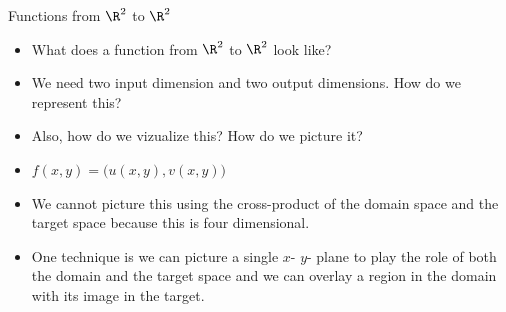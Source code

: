 \documentclass{beamer}
\begin{document}
\begin{frame}{Functions from $\R^2$ to $\R^2$}
\begin{itemize}
\item What does a function from $\R^2$ to $\R^2$ look like?
\item We need two input dimension and two output dimensions.
How do we represent this?
\item Also, how do we vizualize this? How do we picture it?
\item $f(x,y) = \big( u(x,y), v(x,y) \big)$
\item We cannot picture this using the cross-product of the domain space
and the target space because this is four dimensional.
\item One technique is we can picture a single $x$- $y$- plane to play
the role of both the domain and the target space and we can overlay
a region in the domain with its image in the target.
\end{itemize}
\end{frame}
\end{document}
